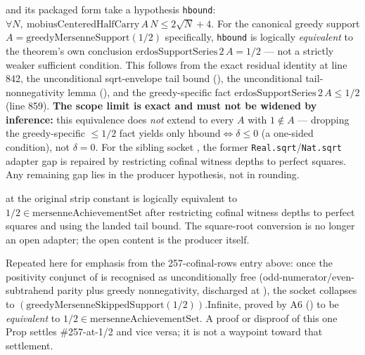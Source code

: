 \begin{rem}
and its packaged form
take a hypothesis \texttt{hbound}: $\forall N,\ \mathrm{mobiusCenteredHalfCarry}\,A\,N \le
2\sqrt N + 4$. For the canonical greedy support $A=\mathrm{greedyMersenneSupport}(1/2)$
specifically, \texttt{hbound} is logically \emph{equivalent} to the theorem's own conclusion
$\mathrm{erdosSupportSeries}\,2\,A=1/2$ — not a strictly weaker sufficient condition. This follows
from the exact residual identity at line 842, the unconditional sqrt-envelope tail bound
(), the
unconditional tail-nonnegativity lemma
(), and the greedy-specific fact
$\mathrm{erdosSupportSeries}\,2\,A\le1/2$ (line 859). \textbf{The scope limit is exact and must
not be widened by inference:} this equivalence does \emph{not} extend to every $A$ with $1\notin
A$ — dropping the greedy-specific $\le1/2$ fact yields only $\mathrm{hbound}\Leftrightarrow
\delta\le0$ (a one-sided condition), not $\delta=0$. For the sibling socket
, the former
\texttt{Real.sqrt}/\texttt{Nat.sqrt} adapter gap is repaired by restricting cofinal witness depths
to perfect squares. Any remaining gap lies in the producer hypothesis, not in rounding.
\end{rem}

\begin{rem}
 at the original strip
constant is logically equivalent to $1/2\in\mathrm{mersenneAchievementSet}$ after restricting
cofinal witness depths to perfect squares and using the landed tail bound. The square-root
conversion is no longer an open adapter; the open content is the producer itself.
\end{rem}

\begin{rem}
Repeated here for emphasis from the 257-cofinal-rows entry above: once the positivity conjunct of
 is recognised as
unconditionally free (odd-numerator/even-subtrahend parity plus greedy nonnegativity, discharged
at ), the socket collapses to
$(\mathrm{greedyMersenneSkippedSupport}(1/2))$.Infinite, proved by A6
() to be \emph{equivalent} to $1/2\in
\mathrm{mersenneAchievementSet}$. A proof or disproof of this one Prop settles \#257-at-1/2 and
vice versa; it is not a waypoint toward that settlement.
\end{rem}

